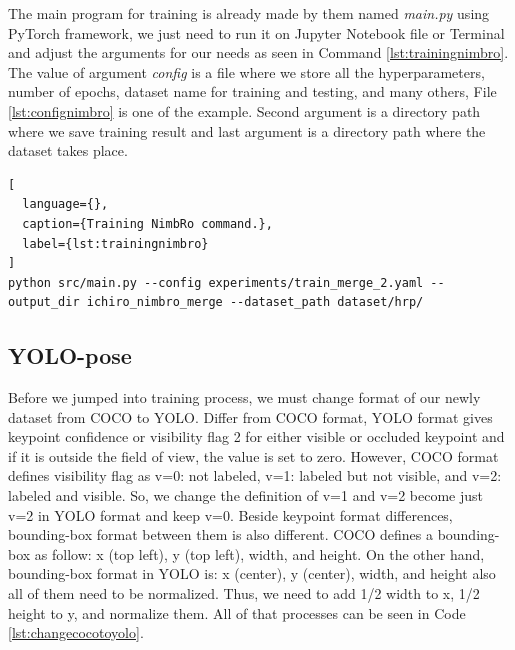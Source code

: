 The main program for training is already made by them named \emph{main.py} using PyTorch framework, we just need to run it on Jupyter Notebook file or Terminal and adjust the arguments for our needs
as seen in Command \ref{lst:trainingnimbro}. The value of argument \emph{config} is a file where we store all the hyperparameters, number of epochs, dataset name for training and testing, and many others, File \ref{lst:confignimbro} is one of the example.
Second argument is a directory path where we save training result and last argument is a directory path where the dataset takes place.

\begin{lstlisting}[
  language={},
  caption={Training NimbRo command.},
  label={lst:trainingnimbro}
]
python src/main.py --config experiments/train_merge_2.yaml --output_dir ichiro_nimbro_merge --dataset_path dataset/hrp/
\end{lstlisting}



\subsection{YOLO-pose}
\label{subsec:trainingyolopose}

Before we jumped into training process, we must change format of our newly dataset from COCO to YOLO. Differ from COCO format, YOLO format gives keypoint confidence or visibility flag 2 for either visible or occluded keypoint
and if it is outside the field of view, the value is set to zero. However, COCO format defines visibility flag as v=0: not labeled, v=1: labeled but not visible, and v=2: labeled and visible. So, we change the definition of
v=1 and v=2 become just v=2 in YOLO format and keep v=0.
Beside keypoint format differences, bounding-box format between them is also different. COCO defines a bounding-box as follow: x (top left), y (top left), width, and height. On the other hand,
bounding-box format in YOLO is: x (center), y (center), width, and height also all of them need to be normalized. Thus, we need to add 1/2 width to x, 1/2 height to y, and normalize them.
All of that processes can be seen in Code \ref{lst:changecocotoyolo}. 



